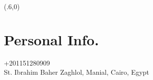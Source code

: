 \documentclass[hidelinks]{article}
\begin{document}
\begin{textblock}{3.3}(.6,0)

\section*{Personal Info.}\vspace{-4pt}
\textcolor{blue}{\LARGE\faMobile}\space\space +201151280909\\[3pt]
\textcolor{blue}{\large\faHome}\space{} St. Ibrahim Baher Zaghlol, Manial, Cairo, Egypt \\[3pt]
\href{mailto: habiba.hamad97@eng-st.cu.edu.eg}{\textcolor{blue}{\faEnvelope}}\space\space\space{\textcolor{black}{habiba.hamad97@eng-st.cu.edu.eg}}

\vspace{-4pt}




\end{textblock}
\end{document}
